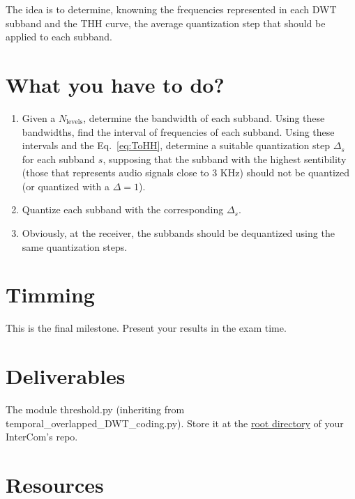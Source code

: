 The idea is to determine, knowning the frequencies represented in each
DWT subband and the THH curve, the average quantization step that
should be applied to each subband.

\section{What you have to do?}

  
\begin{enumerate}
\item Given a $N_{\text{levels}}$, determine the bandwidth of each
  subband. Using these bandwidths, find the interval of frequencies of
  each subband. Using these intervals and the Eq.~\ref{eq:ToHH},
  determine a suitable quantization step $\Delta_s$ for each subband
  $s$, supposing that the subband with the highest sentibility (those
  that represents audio signals close to $3$ KHz) should not be
  quantized (or quantized with a $\Delta=1$).
\item Quantize each subband with the corresponding $\Delta_s$.
\item Obviously, at the receiver, the subbands should be dequantized
  using the same quantization steps.
\end{enumerate}

\section{Timming}

This is the final milestone. Present your results in the exam time.

\section{Deliverables}

The module threshold.py (inheriting from temporal\_overlapped\_DWT\_coding.py). Store it at the
\href{https://github.com/Tecnologias-multimedia/intercom}{root
  directory} of your InterCom's repo.

\section{Resources}



